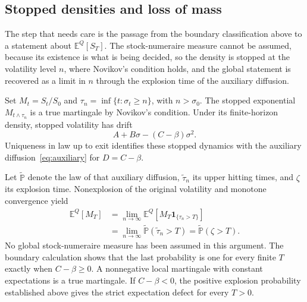 \documentclass[11pt,a4paper]{article}
\theoremstyle{definition}
\theoremstyle{remark}
\newcommand{\E}{\mathbb{E}}
\newcommand{\PP}{\mathbb{P}}
\newcommand{\ind}{\mathbf{1}}
\begin{document}
\subsection{Stopped densities and loss of mass}

The step that needs care is the passage from the boundary classification above to a statement about \(\E^Q[S_T]\). The stock-numeraire measure cannot be assumed, because its existence is what is being decided, so the density is stopped at the volatility level \(n\), where Novikov's condition holds, and the global statement is recovered as a limit in \(n\) through the explosion time of the auxiliary diffusion.

Set \(M_t=S_t/S_0\) and \(\tau_n=\inf\{t:\sigma_t\geq n\}\), with \(n>\sigma_0\). The stopped exponential \(M_{t\wedge\tau_n}\) is a true martingale by Novikov's condition. Under its finite-horizon density, stopped volatility has drift
\[
 A+B\sigma-(C-\beta)\sigma^2.
\]
Uniqueness in law up to exit identifies these stopped dynamics with the auxiliary diffusion~\eqref{eq:auxiliary} for \(D=C-\beta\).

Let \(\widetilde{\PP}\) denote the law of that auxiliary diffusion, \(\widetilde\tau_n\) its upper hitting times, and \(\zeta\) its explosion time. Nonexplosion of the original volatility and monotone convergence yield
\begin{align*}
 \E^Q[M_T]
 &=\lim_{n\to\infty}\E^Q[M_T\ind_{\{\tau_n>T\}}]\\
 &=\lim_{n\to\infty}\widetilde{\PP}(\widetilde\tau_n>T)
 =\widetilde{\PP}(\zeta>T).
\end{align*}
No global stock-numeraire measure has been assumed in this argument. The boundary calculation shows that the last probability is one for every finite \(T\) exactly when \(C-\beta\geq0\). A nonnegative local martingale with constant expectations is a true martingale. If \(C-\beta<0\), the positive explosion probability established above gives the strict expectation defect for every \(T>0\).

\FloatBarrier
\end{document}
